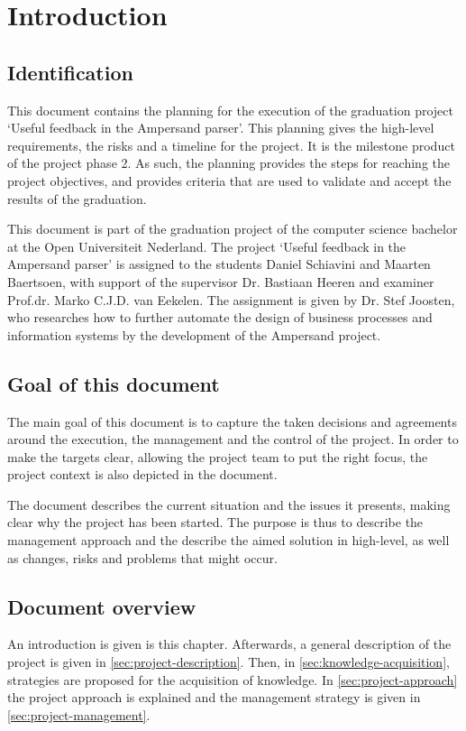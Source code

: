 \section{Introduction}
\subsection{Identification}
%
This document contains the planning for the execution of the graduation project `Useful feedback in the Ampersand parser'.
This planning gives the high-level requirements, the risks and a timeline for the project.
It is the milestone product of the project phase 2.
As such, the planning provides the steps for reaching the project objectives, and provides criteria that are used to validate and accept the results of the graduation.

This document is part of the graduation project of the computer science bachelor at the Open Universiteit Nederland.
The project `Useful feedback in the Ampersand parser' is assigned to the students Daniel Schiavini and Maarten Baertsoen, with support of the supervisor Dr. Bastiaan Heeren and examiner Prof.dr. Marko C.J.D. van Eekelen.
The assignment is given by Dr. Stef Joosten, who researches how to further automate the design of business processes and information systems by the development of the Ampersand project.

\subsection{Goal of this document}
The main goal of this document is to capture the taken decisions and agreements around the execution, the management and the control of the project.
In order to make the targets clear, allowing the project team to put the right focus, the project context is also depicted in the document.

The document describes the current situation and the issues it presents, making clear why the project has been started.
The purpose is thus to describe the management approach and the describe the aimed solution in high-level, as well as changes, risks and problems that might occur.

\subsection{Document overview}
An introduction is given is this chapter.
Afterwards, a general description of the project is given in \autoref{sec:project-description}.
Then, in \autoref{sec:knowledge-acquisition}, strategies are proposed for the acquisition of knowledge.
In \autoref{sec:project-approach} the project approach is explained and the management strategy is given in \autoref{sec:project-management}.


